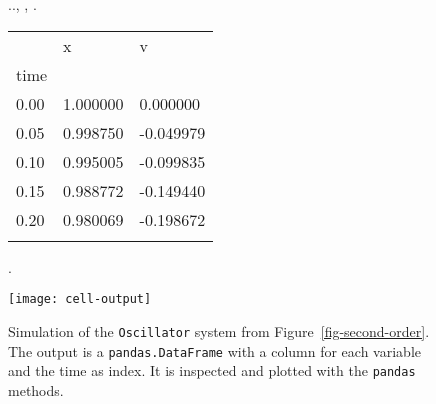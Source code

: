 \begin{figure}[t]
  \begin{minipage}[t]{\columnwidth}
    \begin{CodeInput}
\begin{Highlighting}[]
   
   

 \OperatorTok{=} 
 \OperatorTok{=} .\KeywordTok{(}\OperatorTok{=}.\KeywordTok{(}, , \KeywordTok{))}
.\KeywordTok{()}
\end{Highlighting}
    \end{CodeInput}
    \begin{CodeOutput}
        \begin{tabular}[]{@{}lll@{}}
            \toprule
            & x & v \\
            time & & \\
            \midrule
            0.00 & 1.000000 & 0.000000 \\
            0.05 & 0.998750 & -0.049979 \\
            0.10 & 0.995005 & -0.099835 \\
            0.15 & 0.988772 & -0.149440 \\
            0.20 & 0.980069 & -0.198672 \\
            \botrule
        \end{tabular}
    \end{CodeOutput}
  \end{minipage}%
  \hfill
  \begin{minipage}[t]{\columnwidth}
    \begin{CodeInput}
\begin{Highlighting}[]
.\KeywordTok{()}
\end{Highlighting}
    \end{CodeInput}
    \begin{CodeOutput}
      \texttt{[image: cell-output]}
    \end{CodeOutput}
  \end{minipage}%
  
  \caption{\label{fig-sim}Simulation of the \texttt{Oscillator} system
  from Figure~\ref{fig-second-order}. The output is a
  \texttt{pandas.DataFrame} with a column for each variable and the time
  as index. It is inspected and plotted with the \texttt{pandas} methods.}
\end{figure}
  
